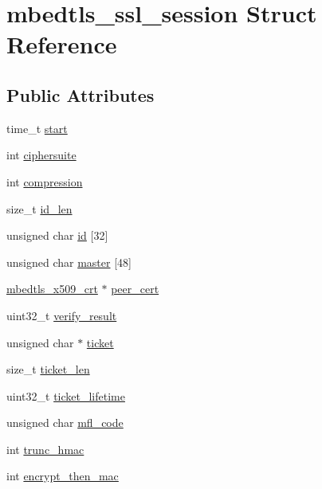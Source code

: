 \hypertarget{structmbedtls__ssl__session}{\section{mbedtls\-\_\-ssl\-\_\-session Struct Reference}
\label{structmbedtls__ssl__session}
}
\subsection*{Public Attributes}
\begin{DoxyCompactItemize}
\item 
time\-\_\-t \hyperlink{structmbedtls__ssl__session_a191c291c985d4637ad2ed5dce190a4fd}{start}
\item 
int \hyperlink{structmbedtls__ssl__session_ad91239f4186bd272e3eb441c9c309b9e}{ciphersuite}
\item 
int \hyperlink{structmbedtls__ssl__session_a71b31d138a01adef0ef99f03084da801}{compression}
\item 
size\-\_\-t \hyperlink{structmbedtls__ssl__session_ad1bc5443b7ac77eadd1df71a69f18ba6}{id\-\_\-len}
\item 
unsigned char \hyperlink{structmbedtls__ssl__session_abd00d63c5fe4ae5dd87cbba60155fbc4}{id} \mbox{[}32\mbox{]}
\item 
unsigned char \hyperlink{structmbedtls__ssl__session_ae8adb932e053a2179530a8aff8750624}{master} \mbox{[}48\mbox{]}
\item 
\hyperlink{structmbedtls__x509__crt}{mbedtls\-\_\-x509\-\_\-crt} $\ast$ \hyperlink{structmbedtls__ssl__session_a2133d1643e524378f074bd9da89aca42}{peer\-\_\-cert}
\item 
uint32\-\_\-t \hyperlink{structmbedtls__ssl__session_a7767cf999b47eaa545fb6a86b3447a20}{verify\-\_\-result}
\item 
unsigned char $\ast$ \hyperlink{structmbedtls__ssl__session_ad639f04ea53fe3602f1188967187436f}{ticket}
\item 
size\-\_\-t \hyperlink{structmbedtls__ssl__session_a381594bf55513430e6c61bf287baf38b}{ticket\-\_\-len}
\item 
uint32\-\_\-t \hyperlink{structmbedtls__ssl__session_a0d6aad183f79d64f7eee544cd5277be2}{ticket\-\_\-lifetime}
\item 
unsigned char \hyperlink{structmbedtls__ssl__session_a9eb94cea53e9e6cb74e6f4204aee0a72}{mfl\-\_\-code}
\item 
int \hyperlink{structmbedtls__ssl__session_ad782325576a5b4c06bf55e2b9f2c7bcc}{trunc\-\_\-hmac}
\item 
int \hyperlink{structmbedtls__ssl__session_ac0ac3fa9cca796f14ae26cfbeb28e807}{encrypt\-\_\-then\-\_\-mac}
\end{DoxyCompactItemize}


